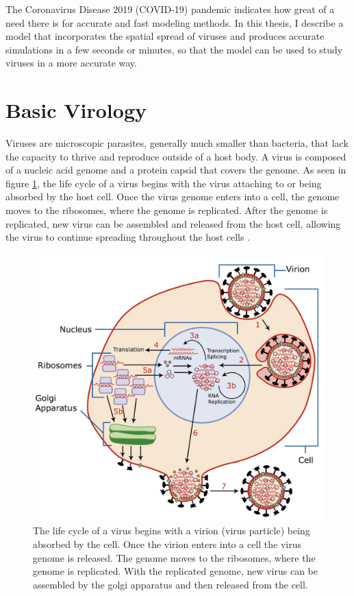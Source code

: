 The Coronavirus Disease 2019 (COVID-19) pandemic indicates how great of a need there is for accurate and fast modeling methods. In this thesis, I describe a model that incorporates the spatial spread of viruses and produces accurate simulations in a few seconds or minutes, so that the model can be used to study viruses in a more accurate way. 

\section{Basic Virology}

Viruses are microscopic parasites, generally much smaller than bacteria, that lack the capacity to thrive and reproduce outside of a host body. A virus is composed of a nucleic acid genome and a protein capsid that covers the genome. As seen in figure \ref{fig:Virus_Replication}, the life cycle of a virus begins with the virus attaching to or being absorbed by the host cell. Once the virus genome enters into a cell, the genome moves to the ribosomes, where the genome is replicated. After the genome is replicated, new virus can be assembled and released from the host cell, allowing the virus to continue spreading throughout the host cells \citep{openstax_microbiology_2016}.

\begin{figure}[h]
    \centering
    \includegraphics[width=0.6\linewidth]{Figures/Virus_Replication_large.pdf}
    \caption{The life cycle of a virus begins with a virion (virus particle) being absorbed by the cell. Once the virion enters into a cell the virus genome is released. The genome moves to the ribosomes, where the genome is replicated. With the replicated genome, new virus can be assembled by the golgi apparatus and then released from the cell.}
    \label{fig:Virus_Replication}
\end{figure}

